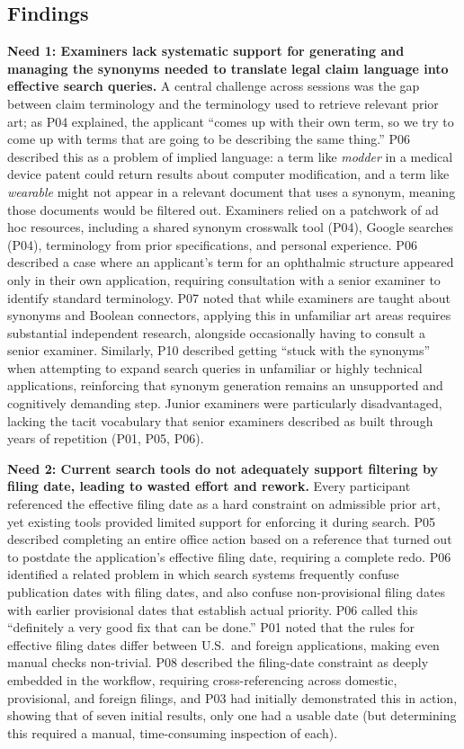 \documentclass[sigconf]{acmart}
\begin{document}
\subsection{Findings}

\smallskip\noindent\textbf{Need 1: Examiners lack systematic support for generating and managing the synonyms needed to translate legal claim language into effective search queries.}
A central challenge across sessions was the gap between claim terminology and the terminology used to retrieve relevant prior art; as P04 explained, the applicant ``comes up with their own term, so we try to come up with terms that are going to be describing the same thing.'' P06 described this as a problem of implied language: a term like \emph{modder} in a medical device patent could return results about computer modification, and a term like \emph{wearable} might not appear in a relevant document that uses a synonym, meaning those documents would be filtered out. Examiners relied on a patchwork of ad hoc resources, including a shared synonym crosswalk tool (P04), Google searches (P04), terminology from prior specifications, and personal experience. P06 described a case where an applicant's term for an ophthalmic structure appeared only in their own application, requiring consultation with a senior examiner to identify standard terminology. P07 noted that while examiners are taught about synonyms and Boolean connectors, applying this in unfamiliar art areas requires substantial independent research, alongside occasionally having to consult a senior examiner. Similarly, P10 described getting ``stuck with the synonyms'' when attempting to expand search queries in unfamiliar or highly technical applications, reinforcing that synonym generation remains an unsupported and cognitively demanding step. Junior examiners were particularly disadvantaged, lacking the tacit vocabulary that senior examiners described as built through years of repetition (P01, P05, P06).

\smallskip\noindent\textbf{Need 2: Current search tools do not adequately support filtering by filing date, leading to wasted effort and rework.}
Every participant referenced the effective filing date as a hard constraint on admissible prior art, yet existing tools provided limited support for enforcing it during search. P05 described completing an entire office action based on a reference that turned out to postdate the application's effective filing date, requiring a complete redo. P06 identified a related problem in which search systems frequently confuse publication dates with filing dates, and also confuse non-provisional filing dates with earlier provisional dates that establish actual priority. P06 called this ``definitely a very good fix that can be done.'' P01 noted that the rules for effective filing dates differ between U.S.\ and foreign applications, making even manual checks non-trivial. P08 described the filing-date constraint as deeply embedded in the workflow, requiring cross-referencing across domestic, provisional, and foreign filings, and P03 had initially demonstrated this in action, showing that of seven initial results, only one had a usable date (but determining this required a manual, time-consuming inspection of each).
\end{document}
